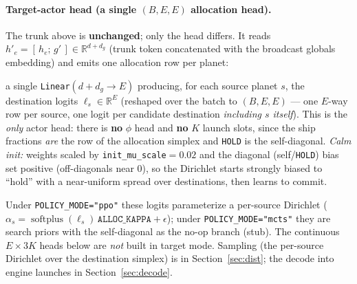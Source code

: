 \documentclass[11pt]{article}
\newcommand{\R}{\mathbb{R}}
\begin{document}
\paragraph{Target-actor head (a single $(B,E,E)$ allocation head).} The trunk above is
\textbf{unchanged}; only the head differs. It reads $h'_e=[\,h_e;\,g'\,]\in\R^{d+d_g}$ (trunk token
concatenated with the broadcast globals embedding) and emits one allocation row per planet:
\begin{description}[nosep,leftmargin=1.4em]
\item[\texttt{dest\_head}:] a single \texttt{Linear}$(d+d_g\to E)$ producing, for each source planet
$s$, the destination logits $\ell_{s}\in\R^{E}$ (reshaped over the batch to $(B,E,E)$ --- one $E$-way
row per source, one logit per candidate destination \emph{including $s$ itself}). This is the
\emph{only} actor head: there is \textbf{no} $\phi$ head and \textbf{no} $K$ launch slots, since the
ship fractions \emph{are} the row of the allocation simplex and \texttt{HOLD} is the self-diagonal.
\emph{Calm init:} weights scaled by \texttt{init\_mu\_scale}$=0.02$ and the diagonal (self/\texttt{HOLD})
bias set positive (off-diagonals near $0$), so the Dirichlet starts strongly biased to ``hold'' with a
near-uniform spread over destinations, then learns to commit.
\end{description}
Under \texttt{POLICY\_MODE="ppo"} these logits parameterize a per-source Dirichlet
($\alpha_s=\operatorname{softplus}(\ell_s)\,\texttt{ALLOC\_KAPPA}+\epsilon$); under
\texttt{POLICY\_MODE="mcts"} they are search priors with the self-diagonal as the no-op branch (stub).
The continuous $E{\times}3K$ heads below are \emph{not} built in target mode. Sampling (the per-source
Dirichlet over the destination simplex) is in Section~\ref{sec:dist}; the decode into engine launches
in Section~\ref{sec:decode}.
\end{document}
